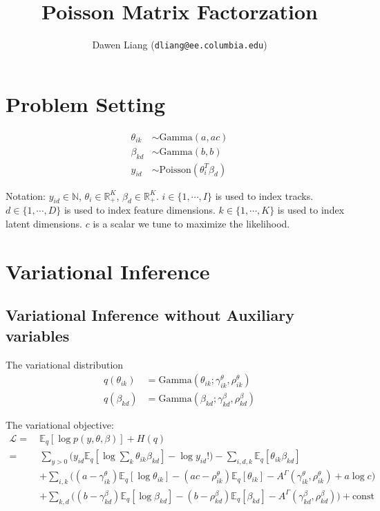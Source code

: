 \documentclass[10pt]{article} %
\title{Poisson Matrix Factorzation}
\author{
Dawen Liang (\texttt{dliang@ee.columbia.edu})
}\date{}                                           %
\begin{document}
\maketitle

\section{Problem Setting}\label{sec:1} 
\begin{equation} \label{eq:model}
\begin{split}
\theta_{ik} &\sim \text{Gamma}(a, ac)\\
\beta_{kd} &\sim \text{Gamma}(b, b)\\
y_{id} &\sim \text{Poisson}( \theta_i^T \beta_d)
\end{split}
\end{equation}

Notation: $y_{id} \in \mathbb{N}$, $\theta_i \in \mathbb{R}_{+}^{K}$, $\beta_d \in \mathbb{R}_{+}^{K}$. $i \in \{1, \cdots, I\}$ is used to index tracks. $d \in \{1, \cdots, D\}$ is used to index feature dimensions. $k \in \{1, \cdots, K\}$ is used to index latent dimensions. $c$ is a scalar we tune to maximize the likelihood. 


\section{Variational Inference}

\subsection{Variational Inference without Auxiliary variables}
The variational distribution
\begin{align*}
q(\theta_{ik}) &= \text{Gamma}(\theta_{ik}; \gamma^\theta_{ik}, \rho^\theta_{ik})\\
q(\beta_{kd}) &= \text{Gamma}(\beta_{kd}; \gamma^\beta_{kd}, \rho^\beta_{kd})
\end{align*}

The variational objective:
\begin{align*}
\mathcal{L} =~& \mathbb{E}_q[\log p(y, \theta, \beta)] + H(q)\\
=~&  \sum_{y > 0} \Big( y_{id} \mathbb{E}_q[\log\sum_k \theta_{ik} \beta_{kd}] - \log y_{id}! \Big) - \sum_{i, d, k} \mathbb{E}_q[\theta_{ik} \beta_{kd}] \\
& + \sum_{i, k}\Big( (a - \gamma_{ik}^\theta) \mathbb{E}_q [\log \theta_{ik}] - (ac - \rho_{ik}^\theta) \mathbb{E}_q[ \theta_{ik}] - A^{\Gamma}(\gamma^\theta_{ik}, \rho^\theta_{ik}) + a \log c \Big)\\
& + \sum_{k, d}\Big( (b - \gamma_{kd}^\beta) \mathbb{E}_q [\log \beta_{kd}] - (b - \rho_{kd}^\beta) \mathbb{E}_q[\beta_{kd}] - A^{\Gamma}(\gamma^\beta_{kd}, \rho^\beta_{kd}) \Big) + \text{const}
\end{align*}
\end{document}
